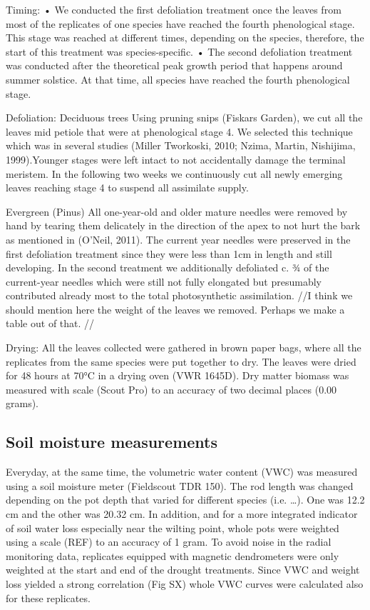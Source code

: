 \documentclass{article}
\begin{document}
	Timing:
	•	We conducted the first defoliation treatment once the leaves from most of the replicates of one species have reached the fourth phenological stage. This stage was reached at different times, depending on the species, therefore, the start of this treatment was species-specific. 
	•	The second defoliation treatment was conducted after the theoretical peak growth period that happens around summer solstice. At that time, all species have reached the fourth phenological stage. 
	
	Defoliation:
	Deciduous trees 
	Using pruning snips (Fiskars Garden), we cut all the leaves mid petiole that were at phenological stage 4. We selected this technique which was in several studies (Miller Tworkoski, 2010; Nzima, Martin, Nishijima, 1999).Younger stages were left intact to not accidentally damage the terminal meristem. In the following two weeks we continuously cut all newly emerging leaves reaching stage 4 to suspend all assimilate supply.
	
	Evergreen (Pinus)
	All one-year-old and older mature needles were removed by hand by tearing them delicately in the direction of the apex to not hurt the bark as mentioned in (O’Neil, 2011). The current year needles were preserved in the first defoliation treatment since they were less than 1cm in length and still developing. In the second treatment we additionally defoliated c. ¾ of the current-year needles which were still not fully elongated but presumably contributed already most to the total photosynthetic assimilation.
	//I think we should mention here the weight of the leaves we removed. Perhaps we make a table out of that. //
	
	Drying:
	All the leaves collected were gathered in brown paper bags, where all the replicates from the same species were put together to dry. The leaves were dried for 48 hours at 70°C in a drying oven (VWR 1645D). Dry matter biomass was measured with scale (Scout Pro) to an accuracy of two decimal places (0.00 grams).
	
	\subsection*{Soil moisture measurements}
	Everyday, at the same time, the volumetric water content (VWC) was measured using a soil moisture meter (Fieldscout TDR 150). The rod length was changed depending on the pot depth that varied for different species (i.e. …). One was 12.2 cm and the other was 20.32 cm. In addition, and for a more integrated indicator of soil water loss especially near the wilting point, whole pots were weighted using a scale (REF) to an accuracy of 1 gram. To avoid noise in the radial monitoring data, replicates equipped with magnetic dendrometers were only weighted at the start and end of the drought treatments. Since VWC and weight loss yielded a strong correlation (Fig SX) whole VWC curves were calculated also for these replicates.
	
\end{document}
